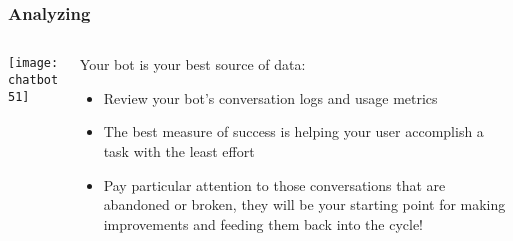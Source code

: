 \begin{frame}[fragile]\frametitle{Analyzing}
    \begin{columns}
    \begin{column}[t]{0.5\linewidth}
\begin{center}
\texttt{[image: chatbot51]}
\end{center}
\end{column}
    \begin{column}[t]{0.5\linewidth}
Your bot is your best source of data:

\begin{itemize}
\item Review your bot's conversation logs and usage metrics
\item The best measure of success is helping your user accomplish a task with the least effort
\item Pay particular attention to those conversations that are abandoned or broken, they will be your starting point for making improvements and feeding them back into the cycle!
\end{itemize}
\end{column}
\end{columns}
\end{frame}

